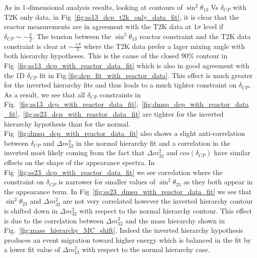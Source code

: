 As in 1-dimensional analysis results,
looking at contours of $\sin^2 \theta_{13}$ Vs $\delta_{CP}$ with T2K only data, 
in Fig~\ref{fig:ss13_dcp_t2k_only_data_fit}, it is clear that the reactor measurements are 
in agreement with the T2K data at $1\sigma$ level if $\delta_{CP} \sim - \frac{\pi}{2}$. The tension 
between the $\sin^2 \theta_{13}$ reactor constraint and the T2K data constraint is clear at 
$\sim \frac{+\pi}{2}$ where the T2K data prefer a lager mixing angle with both hierarchy hypotheses.
This is the cause of the closed 90\% contour in Fig~\ref{fig:ss13_dcp_with_reactor_data_fit} which is also in good agreement with the 1D $\delta_{CP}$ fit in Fig.\ref{fig:dcp_fit_with_reactor_data}. This effect is much greater for the inverted hierarchy fits and thus leads to a much tighter constraint on $\delta_{CP}$. 
As a result, we see that all $\delta_{CP}$ constraints in 
Fig.~\ref{fig:ss13_dcp_with_reactor_data_fit},~\ref{fig:dmsq_dcp_with_reactor_data_fit},~\ref{fig:ss23_dcp_with_reactor_data_fit} 
are tighter for the inverted hierarchy hypothesis than for the normal.
Fig~\ref{fig:dmsq_dcp_with_reactor_data_fit} also shows a slight anti-correlation between $\delta_{CP}$ 
and $\Delta m^2_{32}$ in the normal hierarchy fit and a correlation in the inverted most likely coming 
from the fact that $\Delta m^2_{32}$ and $cos(\delta_{CP})$ have similar effects on the shape of the appearance spectra. 
In Fig~\ref{fig:ss23_dcp_with_reactor_data_fit} we see correlation where the constraint on $\delta_{CP}$ is narrower 
for smaller values of $\sin^2 \theta_{23}$ as they both appear in the appearance term. 
In Fig~\ref{fig:ss23_dmsq_with_reactor_data_fit} we see that $\sin^2 \theta_{23}$ and $\Delta m^2_{32}$ 
are not very correlated however the inverted hierarchy contour is shifted down in $\Delta m^2_{32}$ 
with respect to the normal hierarchy contour. 
This effect is due to the correlation between $\Delta m^2_{32}$ and the mass hierarchy shown in Fig.~\ref{fig:mass_hierarchy_MC_shift}. 
Indeed the inverted hierarchy hypothesis produces an event migration toward higher energy 
which is balanced in the fit by a lower fit value of $\Delta m^2_{13}$ with respect to the normal hierarchy case.


